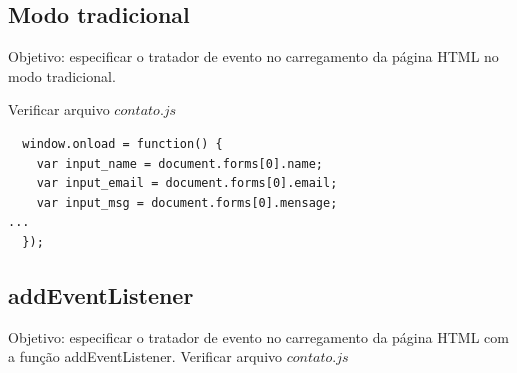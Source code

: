 \subsection{Modo tradicional}
Objetivo: especificar o tratador de evento no carregamento da página HTML no modo tradicional.

Verificar arquivo $contato.js$
	
 \begin{lstlisting}
  window.onload = function() {
    var input_name = document.forms[0].name;
    var input_email = document.forms[0].email;
    var input_msg = document.forms[0].mensage;
...
  });
 \end{lstlisting}



\subsection{addEventListener}
 Objetivo: especificar o tratador de evento no carregamento da página HTML com a função addEventListener.
	Verificar arquivo $contato.js$
